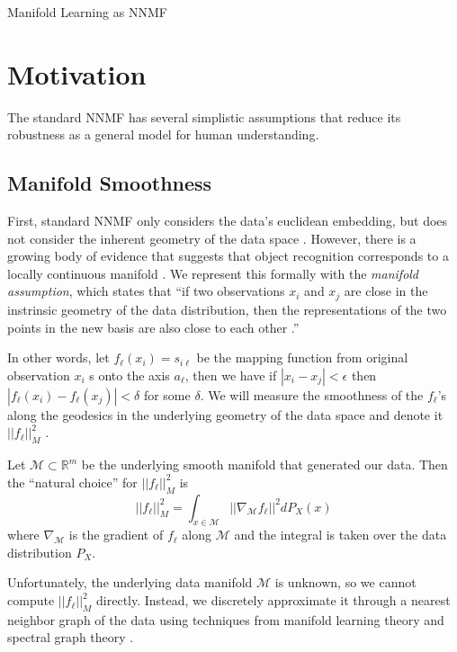 \documentclass[12pt]{pom_thesis}
\begin{document}
\begin{chapter}{Manifold Learning as NNMF}
	\label{supervised}
	
	\section{Motivation}
	The standard NNMF has several simplistic assumptions that reduce its robustness as a general model for human understanding. 

	\subsection*{Manifold Smoothness}
	First, standard NNMF only considers the data's euclidean embedding, but does not consider the inherent geometry of the data space \cite{cai2008non}. However, there is a growing body of evidence that suggests that object recognition corresponds to a locally continuous manifold \cite{dicarlo2012does}. We represent this formally with the \textit{manifold assumption}, which states that ``if two observations $x_i$ and $x_j$ are close in the instrinsic geometry of the data distribution, then the representations of the two points in the new basis are also close to each other \cite{belkin2001laplacian, cai2008non}.''
	
	In other words, let  $f_\ell(x_i) = s_{i\ell}$ be the mapping function from original observation $x_i$ s onto the axis $a_\ell$, then we have if $|x_i - x_j| < \epsilon$ then $|f_\ell(x_i) - f_\ell(x_j) | < \delta$ for some $\delta$. We will measure the smoothness of the $f_\ell$'s along the geodesics in the underlying geometry of the data space and denote it $||f_\ell||^2_M$ \cite{cai2008non}. 
	
	Let $\mathcal{M} \subset \mathbb{R}^m$ be the underlying smooth manifold that generated our data. Then the ``natural choice'' for $||f_\ell||^2_M$ is 
	$$||f_\ell||^2_M = \int_{x \in \mathcal{M}} ||\nabla_\mathcal{M} f_\ell||^2 dP_X(x)$$
	where $\nabla_\mathcal{M}$ is the gradient of $f_\ell$ along $\mathcal{M}$ and the integral is taken over the data distribution $P_X$.
	
	Unfortunately, the underlying data manifold $\mathcal{M}$ is unknown, so we cannot compute $||f_\ell||^2_M$ directly. Instead, we discretely approximate it through a nearest neighbor graph of the data using techniques from manifold learning theory \cite{belkin2003problems} and spectral graph theory \cite{chung1997spectral}. 
	

\end{chapter}
\end{document}
